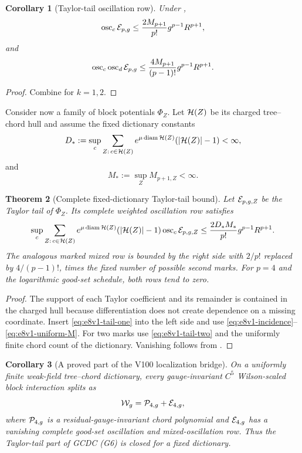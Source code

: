 \documentclass[11pt,oneside]{book}
\newtheorem{theorem}{Theorem}[chapter]
\newtheorem{corollary}[theorem]{Corollary}
\theoremstyle{definition}
\theoremstyle{remark}
\newcommand{\osc}{\operatorname{osc}}
\begin{document}
\begin{corollary}[Taylor-tail oscillation row]
\label{cor:e8v1-tail-row}
Under ,
\[
 \osc_c{\cal E}_{p,g}
 \leq
 \frac{2M_{p+1}}{p!}g^{p-1}R^{p+1},                 \label{eq:e8v1-tail-one}
\]
and
\[
 \osc_c\osc_d{\cal E}_{p,g}
 \leq
 \frac{4M_{p+1}}{(p-1)!}g^{p-1}R^{p+1}.             \label{eq:e8v1-tail-two}
\]
\end{corollary}

\begin{proof}
Combine
 for
\(k=1,2\).
\end{proof}

Consider now a family of block potentials \(\Phi_Z\).  Let
\({\cal H}(Z)\) be its charged tree--chord hull and assume the fixed
dictionary constants
\[
 D_*:=
 \sup_c\sum_{Z:\,c\in{\cal H}(Z)}
 e^{\mu\operatorname{diam}{\cal H}(Z)}
 (|{\cal H}(Z)|-1)
 <\infty,                                             \label{eq:e8v1-incidence}
\]
and
\[
 M_*:=\sup_Z M_{p+1,Z}<\infty.                        \label{eq:e8v1-uniform-M}
\]

\begin{theorem}[Complete fixed-dictionary Taylor-tail bound]
\label{thm:e8v1-complete-tail}
Let \({\cal E}_{p,g,Z}\) be the Taylor tail of \(\Phi_Z\).  Its
complete weighted oscillation row satisfies
\[
 \sup_c
 \sum_{Z:\,c\in{\cal H}(Z)}
 e^{\mu\operatorname{diam}{\cal H}(Z)}
 (|{\cal H}(Z)|-1)
 \osc_c{\cal E}_{p,g,Z}
 \leq
 \frac{2D_*M_*}{p!}g^{p-1}R^{p+1}.                  \label{eq:e8v1-complete-tail}
\]
The analogous marked mixed row is bounded by the right side with
\(2/p!\) replaced by \(4/(p-1)!\), times the fixed number of possible
second marks.  For \(p=4\) and the logarithmic good-set schedule, both
rows tend to zero.
\end{theorem}

\begin{proof}
The support of each Taylor coefficient and its remainder is contained
in the charged hull because differentiation does not create dependence
on a missing coordinate.  Insert
\eqref{eq:e8v1-tail-one} into the left side and use
\eqref{eq:e8v1-incidence}--\eqref{eq:e8v1-uniform-M}.
For two marks use \eqref{eq:e8v1-tail-two} and the uniformly finite
chord count of the dictionary.  Vanishing follows from
.
\end{proof}

\begin{corollary}[A proved part of the V100 localization bridge]
\label{cor:e8v1-GCDC}
On a uniformly finite weak-field tree--chord dictionary, every
gauge-invariant \(C^5\) Wilson-scaled block interaction splits as
\[
 {\cal W}_g
 =
 {\cal P}_{4,g}+{\cal E}_{4,g},                      \label{eq:e8v1-split}
\]
where \({\cal P}_{4,g}\) is a residual-gauge-invariant chord
polynomial and \({\cal E}_{4,g}\) has a vanishing complete good-set
oscillation and mixed-oscillation row.  Thus the Taylor-tail part of
GCDC (G6) is closed for a fixed dictionary.
\end{corollary}
\end{document}
